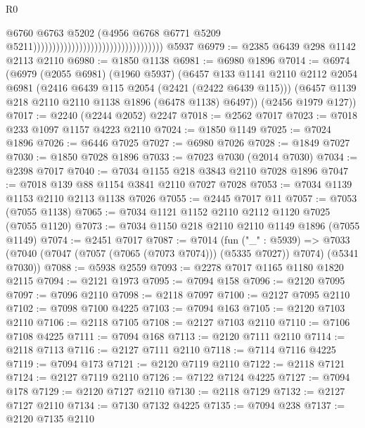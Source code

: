 \begin{lexlean}{R0}
\begin{coremodule}
                                                                      @6760
                                                                      @6763
                                                                      @5202
                                                                      (@4956
                                                                        @6768
                                                                        @6771
                                                                        @5209
                                                                        @5211))))))))))))))))))))))))))))))))))
    @5937
@6979 := @2385 @6439 @298 @1142 @2113 @2110
@6980 := @1850 @1138
@6981 := @6980 @1896
@7014 := @6974
    (@6979
      (@2055 @6981)
      (@1960 @5937)
      (@6457
        @133
        @1141
        @2110
        @2112
        @2054
        @6981
        (@2416 @6439 @115 @2054 (@2421 (@2422 @6439 @115)))
        (@6457 @1139 @218 @2110 @2110 @1138 @1896 (@6478 @1138) @6497))
      (@2456 @1979 @127))
@7017 := @2240 (@2244 @2052) @2247
@7018 := @2562 @7017
@7023 := @7018 @233 @1097 @1157 @4223 @2110
@7024 := @1850 @1149
@7025 := @7024 @1896
@7026 := @6446 @7025
@7027 := @6980 @7026
@7028 := @1849 @7027
@7030 := @1850 @7028 @1896
@7033 := @7023 @7030 (@2014 @7030)
@7034 := @2398 @7017
@7040 := @7034 @1155 @218 @3843 @2110 @7028 @1896
@7047 := @7018 @139 @88 @1154 @3841 @2110 @7027 @7028
@7053 := @7034 @1139 @1153 @2110 @2113 @1138 @7026
@7055 := @2445 @7017 @11
@7057 := @7053 (@7055 @1138)
@7065 := @7034 @1121 @1152 @2110 @2112 @1120 @7025 (@7055 @1120)
@7073 := @7034 @1150 @218 @2110 @2110 @1149 @1896 (@7055 @1149)
@7074 := @2451 @7017
@7087 := @7014
    (fun ("_" : @5939) =>
    @7033 (@7040 (@7047 (@7057 (@7065 (@7073 @7074))) (@5335 @7027)) @7074) (@5341 @7030))
@7088 := @5938 @2559
@7093 := @2278 @7017 @1165 @1180 @1820 @2115
@7094 := @2121 @1973
@7095 := @7094 @158
@7096 := @2120 @7095
@7097 := @7096 @2110
@7098 := @2118 @7097
@7100 := @2127 @7095 @2110
@7102 := @7098 @7100 @4225
@7103 := @7094 @163
@7105 := @2120 @7103 @2110
@7106 := @2118 @7105
@7108 := @2127 @7103 @2110
@7110 := @7106 @7108 @4225
@7111 := @7094 @168
@7113 := @2120 @7111 @2110
@7114 := @2118 @7113
@7116 := @2127 @7111 @2110
@7118 := @7114 @7116 @4225
@7119 := @7094 @173
@7121 := @2120 @7119 @2110
@7122 := @2118 @7121
@7124 := @2127 @7119 @2110
@7126 := @7122 @7124 @4225
@7127 := @7094 @178
@7129 := @2120 @7127 @2110
@7130 := @2118 @7129
@7132 := @2127 @7127 @2110
@7134 := @7130 @7132 @4225
@7135 := @7094 @238
@7137 := @2120 @7135 @2110

\end{coremodule}
\end{lexlean}
